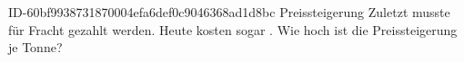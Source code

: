 \begin{exercise}
      {ID-60bf9938731870004efa6def0c9046368ad1d8bc}
      {Preissteigerung}
  \ifproblem\problem
    Zuletzt musste für  Fracht  gezahlt werden.
    Heute kosten  sogar . Wie hoch ist die Preissteigerung
    je Tonne?
  \fi
\end{exercise}
